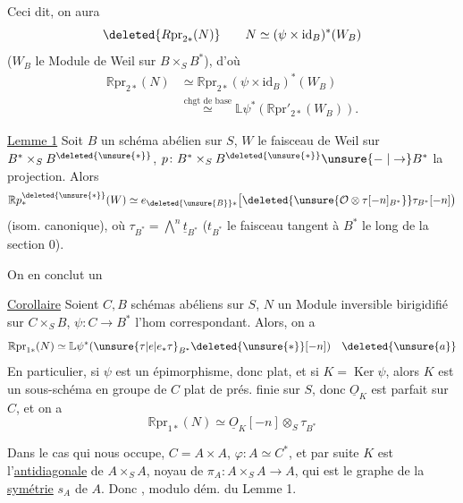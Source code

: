 Ceci dit, on aura
\[
\deleted{R \mathrm{pr}_{2*}(N)}\qquad N\simeq(\psi\times \mathrm{id}_B)^*(W_B)
\]
($W_B$ le Module de Weil sur $B\times_S B^*$), d'où
\[
\begin{aligned}
\mathbb{R} \mathrm{pr}_{2*}(N)&\simeq \mathbb{R} \mathrm{pr}_{2*}(\psi\times \mathrm{id}_B)^*(W_B)\\
&\overset{\text{chgt de base}}{\simeq}\mathbb{L}\psi^*(\mathbb{R} \mathrm{pr}'_{2*}(W_B)).
\end{aligned}
\]

\uline{Lemme 1} Soit $B$ un schéma abélien sur $S$, $W$ le faisceau de Weil sur $B^*\times_S B^{\deleted{\unsure{*}}}$, $p\colon B^*\times_S B^{\deleted{\unsure{*}}}\unsure{\mathrel{-}|\to}B^*$ la projection. Alors
\[
\mathbb{R} p^{\deleted{\unsure{*}}}_*(W)\simeq e_{\deleted{\unsure{B}}*}\bigl[\deleted{\unsure{\mathcal{O}\otimes\tau[-n]_{B^*}}}\tau_{B^*}[-n]\bigr)
\]
(isom. canonique), où $\tau_{B^*}=\bigwedge^n\underline{t}_{B^*}$ ($t_{B^*}$ le faisceau tangent à $B^*$ le long de la section $0$).

On en conclut un

\uline{Corollaire} Soient $C,B$ schémas abéliens sur $S$, $N$ un Module inversible birigidifié sur $C\times_S B$, $\psi\colon C\longrightarrow B^*$ l'hom correspondant. Alors, on a
\[
\mathbb{R} \mathrm{pr}_{1*}(N)\simeq \mathbb{L}\psi^*(\unsure{\tau|e|e_*\tau}_{B^*}\deleted{\unsure{*}}[-n])\quad\deleted{\unsure{a}}
\]
En particulier, si $\psi$ est un épimorphisme,  donc plat, et si $K=\operatorname{Ker}\psi$, alors $K$ est un sous-schéma en groupe de $C$ plat de prés. finie sur $S$, donc  $\underline{O}_K$ est parfait sur $C$, et on a
\[
\mathbb{R} \mathrm{pr}_{1*}(N)\simeq\underline{O}_K[-n]\otimes_S\tau_{B^*}
\]

Dans le cas qui nous occupe, $C=A\times A$,  $\varphi\colon A\simeq C^*$, et  par suite $K$ est l'\uline{antidiagonale} de $A\times_S A$, noyau de $\pi_A\colon A\times_S A\longrightarrow A$, qui est le graphe de la \uline{symétrie} $s_A$ de $A$. Donc  , modulo dém. du Lemme 1.
